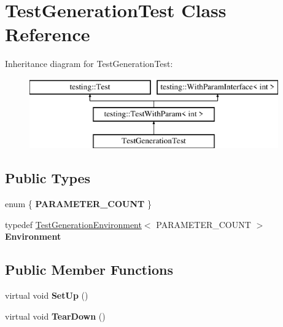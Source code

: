 \hypertarget{class_test_generation_test}{}\section{Test\+Generation\+Test Class Reference}
\label{class_test_generation_test}
Inheritance diagram for Test\+Generation\+Test\+:\begin{figure}[H]
\begin{center}
\leavevmode
\includegraphics[height=3.000000cm]{class_test_generation_test}
\end{center}
\end{figure}
\subsection*{Public Types}
\begin{DoxyCompactItemize}
\item 
\mbox{\label{class_test_generation_test_a124a5970380c672c801fe25e6581de8b}} 
enum \{ {\bfseries P\+A\+R\+A\+M\+E\+T\+E\+R\+\_\+\+C\+O\+U\+NT}
 \}
\item 
\mbox{\label{class_test_generation_test_aeff004d79bbb376d7acecd28f9fb71c6}} 
typedef \mbox{\hyperlink{class_test_generation_environment}{Test\+Generation\+Environment}}$<$ P\+A\+R\+A\+M\+E\+T\+E\+R\+\_\+\+C\+O\+U\+NT $>$ {\bfseries Environment}
\end{DoxyCompactItemize}
\subsection*{Public Member Functions}
\begin{DoxyCompactItemize}
\item 
\mbox{\label{class_test_generation_test_a9705d633439b360b338503599a360ea8}} 
virtual void {\bfseries Set\+Up} ()
\item 
\mbox{\label{class_test_generation_test_a447190a74b306b4b94c25fed474d6029}} 
virtual void {\bfseries Tear\+Down} ()
\end{DoxyCompactItemize}
